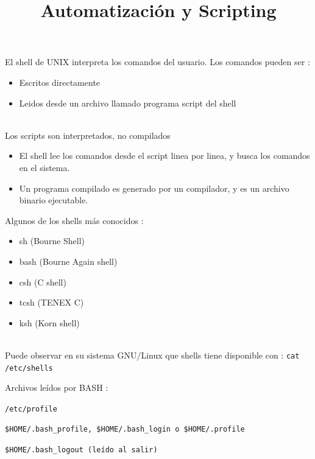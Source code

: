 \documentclass{beamer}
\title{Automatización y Scripting}
\begin{document}
\begin{frame}
  \titlepage
\end{frame}





\begin{frame}{}
El shell de UNIX interpreta los comandos del usuario. Los comandos pueden ser :
\begin{itemize}
\item Escritos directamente 
\item Leidos desde un archivo llamado programa script del shell\\ \
\end{itemize}

Los scripts son interpretados, no compilados
\begin{itemize}
\item El shell lee los comandos desde el script linea por linea, y busca los comandos en el sistema.
\item Un programa compilado es generado por un compilador, y es un archivo binario ejecutable.
\end{itemize}

\end{frame}


\begin{frame}{}
Algunos de los shells más conocidos : 
\begin{itemize}
\item sh (Bourne Shell)
\item bash (Bourne Again shell)
\item csh (C shell)
\item tcsh (TENEX C)
\item ksh (Korn shell)\\ \
\end{itemize}

Puede observar en su sistema GNU/Linux que shells tiene disponible con : \texttt{cat /etc/shells}

\end{frame}


\begin{frame}{}
Archivos leídos por BASH : 

\texttt{/etc/profile}

\texttt{\$HOME/.bash\_profile, \$HOME/.bash\_login o \$HOME/.profile }

\texttt{\$HOME/.bash\_logout (leído al salir) }

\end{frame}
\end{document}
